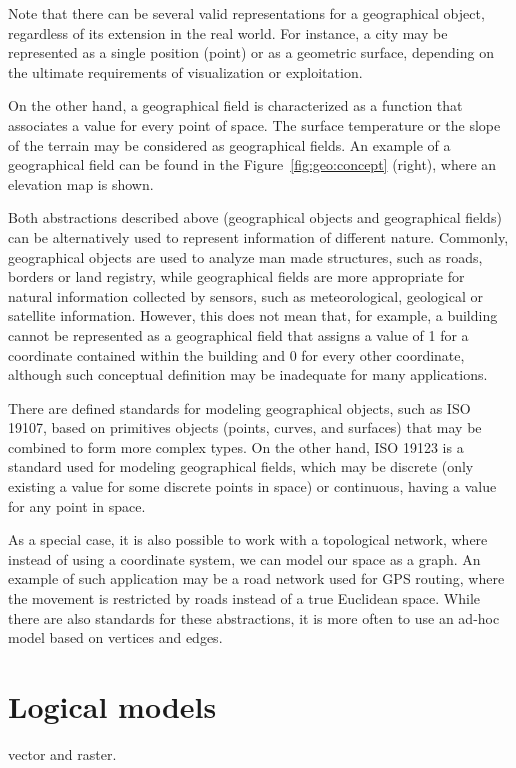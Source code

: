     Note that there can be several valid representations for a geographical object, regardless of its extension in the real world. For instance, a city may be represented as a single position (point) or as a geometric surface, depending on the ultimate requirements of visualization or exploitation.
    
    On the other hand, a geographical field is characterized as a function that associates a value for every point of space. The surface temperature or the slope of the terrain may be considered as geographical fields. An example of a geographical field can be found in the Figure~\ref{fig:geo:concept} (right), where an elevation map is shown.
    
    Both abstractions described above (geographical objects and geographical fields) can be alternatively used to represent information of different nature. Commonly, geographical objects are used to analyze man made structures, such as roads, borders or land registry, while geographical fields are more appropriate for natural information collected by sensors, such as meteorological, geological or satellite information. However, this does not mean that, for example, a building cannot be represented as a geographical field that assigns a value of 1 for a coordinate contained within the building and 0 for every other coordinate, although such conceptual definition may be inadequate for many applications.

    There are defined standards for modeling geographical objects, such as ISO 19107, based on primitives objects (points, curves, and surfaces) that may be combined to form more complex types. On the other hand, ISO 19123 is a standard used for modeling geographical fields, which may be discrete (only existing a value for some discrete points in space) or continuous, having a value for any point in space.
    
    As a special case, it is also possible to work with a topological network, where instead of using a coordinate system, we can model our space as a graph. An example of such application may be a road network used for GPS routing, where the movement is restricted by roads instead of a true Euclidean space. While there are also standards for these abstractions, it is more often to use an ad-hoc model based on vertices and edges.
    
    \section{Logical models}
    vector and raster.
    
